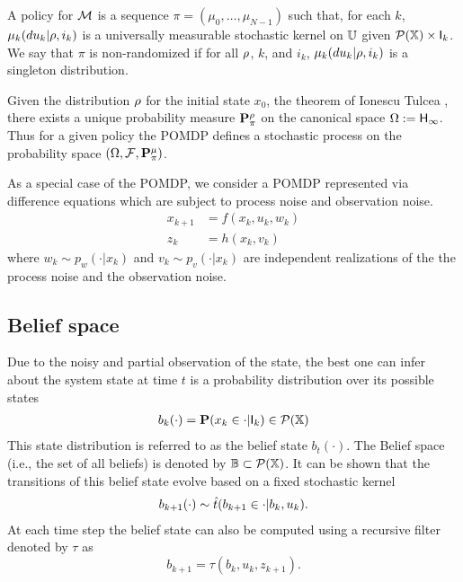 \documentclass{ifacconf}
\begin{document}
\begin{definition}
	A policy for $\MDP$ is a sequence $\pi=(\mu_0,\ldots,\mu_{N-1})$ such that, for each $k$, $\mu_k(du_k|\init, i_k)$ is a universally measurable stochastic kernel on $\U$  given $\mathcal{P}(\X)\times \I_k$.
	We say that $\pi$ is non-randomized if for all $\init$, $k$, and $i_k$,    $\mu_k(du_k|\init, i_k)$ is a singleton distribution.
\end{definition}
 Given the distribution $\init$ for the initial state $x_0$,  the theorem of Ionescu Tulcea \citep{hll1996}, there exists a unique probability measure $\P_\pi^\init$ on the canonical space $\Omega:=\Hist_\infty$. Thus for a given policy the POMDP defines a stochastic process on the probability space  
 $(\Omega,\mathcal F,\P_\pi^\mu)$.
\begin{example}
	As a special case of the POMDP, we consider a POMDP represented via difference equations which are subject to process noise and observation noise.
\begin{align*}
x_{k+1}&=f(x_k,u_k,w_k)\\
z_k&=h(x_k,v_k)
\end{align*}
where $w_k\sim p_w(\cdot|x_k)$ and $v_k\sim p_v(\cdot|x_k)$ are independent realizations of the the process noise and the observation noise.


\end{example}

 \subsection{Belief space}
Due to the noisy and partial observation of the state, the best one can infer about the system state at time  $t$ is a probability distribution over its possible states
\begin{align}
	b_k(\cdot)=\P(x_k\in \cdot|\I_k)\in \mathcal P (\X)
\end{align}
This state distribution is referred to as the belief state $b_t(\cdot)$. 
The Belief space (i.e., the set of all beliefs) is denoted by $\mathbb{B}\subset \mathcal P(\X)$.
It can be shown that the transitions of this belief state evolve based on a fixed stochastic kernel
\begin{align}
	 b_{k+1}(\cdot)\sim \trb(b_{k+1}\in \cdot|b_k,u_k).
\end{align}
At each time step the belief state can also be computed using a 
recursive filter denoted by $\tau$ as 
\[b_{k+1}=\tau(b_k,u_k,z_{k+1}).\]
\end{document}
